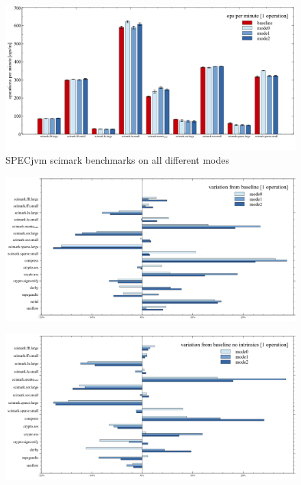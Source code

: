 \begin{figure}[ht]
  \begin{center}
    \centering
    \includegraphics[width=1.0\textwidth]{figures/scimark_warmup.png}
    \caption{SPECjvm scimark benchmarks on all different modes}
    \label{f:scimark_warmup}
  \end{center}
\end{figure}

\begin{figure}[ht]
  \begin{center}
    \centering
    \includegraphics[width=1.0\textwidth]{figures/all_warmup_variation.png}
    \caption{}
    \label{f:all_warmup_variation}
  \end{center}
\end{figure}



\begin{figure}[ht]
  \begin{center}
    \centering
    \includegraphics[width=1.0\textwidth]{figures/all_warmup_nointrinsics_variation.png}
    \caption{}
    \label{f:all_warmup_nointrinsics_variation}
  \end{center}
\end{figure}

